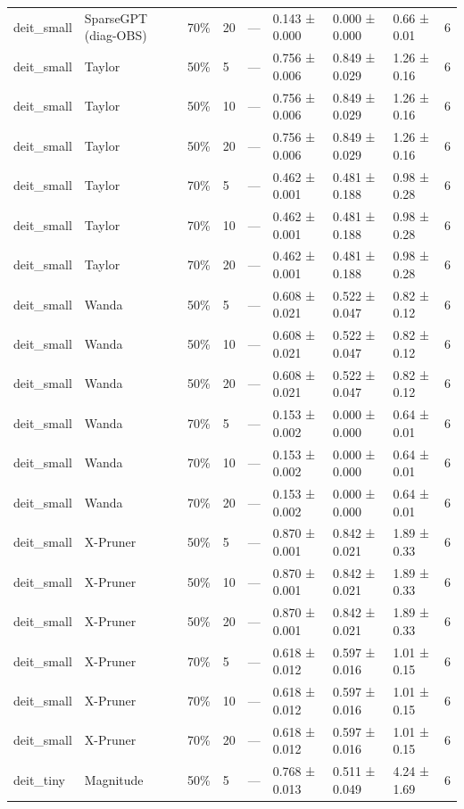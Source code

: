 \begin{table}[t]
\begin{tabular}{lllllllll}
deit\_small & SparseGPT (diag-OBS) & 70\% & 20 & — & 0.143 ± 0.000 & 0.000 ± 0.000 & 0.66 ± 0.01 & 6 \\
deit\_small & Taylor & 50\% & 5 & — & 0.756 ± 0.006 & 0.849 ± 0.029 & 1.26 ± 0.16 & 6 \\
deit\_small & Taylor & 50\% & 10 & — & 0.756 ± 0.006 & 0.849 ± 0.029 & 1.26 ± 0.16 & 6 \\
deit\_small & Taylor & 50\% & 20 & — & 0.756 ± 0.006 & 0.849 ± 0.029 & 1.26 ± 0.16 & 6 \\
deit\_small & Taylor & 70\% & 5 & — & 0.462 ± 0.001 & 0.481 ± 0.188 & 0.98 ± 0.28 & 6 \\
deit\_small & Taylor & 70\% & 10 & — & 0.462 ± 0.001 & 0.481 ± 0.188 & 0.98 ± 0.28 & 6 \\
deit\_small & Taylor & 70\% & 20 & — & 0.462 ± 0.001 & 0.481 ± 0.188 & 0.98 ± 0.28 & 6 \\
deit\_small & Wanda & 50\% & 5 & — & 0.608 ± 0.021 & 0.522 ± 0.047 & 0.82 ± 0.12 & 6 \\
deit\_small & Wanda & 50\% & 10 & — & 0.608 ± 0.021 & 0.522 ± 0.047 & 0.82 ± 0.12 & 6 \\
deit\_small & Wanda & 50\% & 20 & — & 0.608 ± 0.021 & 0.522 ± 0.047 & 0.82 ± 0.12 & 6 \\
deit\_small & Wanda & 70\% & 5 & — & 0.153 ± 0.002 & 0.000 ± 0.000 & 0.64 ± 0.01 & 6 \\
deit\_small & Wanda & 70\% & 10 & — & 0.153 ± 0.002 & 0.000 ± 0.000 & 0.64 ± 0.01 & 6 \\
deit\_small & Wanda & 70\% & 20 & — & 0.153 ± 0.002 & 0.000 ± 0.000 & 0.64 ± 0.01 & 6 \\
deit\_small & X-Pruner & 50\% & 5 & — & 0.870 ± 0.001 & 0.842 ± 0.021 & 1.89 ± 0.33 & 6 \\
deit\_small & X-Pruner & 50\% & 10 & — & 0.870 ± 0.001 & 0.842 ± 0.021 & 1.89 ± 0.33 & 6 \\
deit\_small & X-Pruner & 50\% & 20 & — & 0.870 ± 0.001 & 0.842 ± 0.021 & 1.89 ± 0.33 & 6 \\
deit\_small & X-Pruner & 70\% & 5 & — & 0.618 ± 0.012 & 0.597 ± 0.016 & 1.01 ± 0.15 & 6 \\
deit\_small & X-Pruner & 70\% & 10 & — & 0.618 ± 0.012 & 0.597 ± 0.016 & 1.01 ± 0.15 & 6 \\
deit\_small & X-Pruner & 70\% & 20 & — & 0.618 ± 0.012 & 0.597 ± 0.016 & 1.01 ± 0.15 & 6 \\
deit\_tiny & Magnitude & 50\% & 5 & — & 0.768 ± 0.013 & 0.511 ± 0.049 & 4.24 ± 1.69 & 6 \\

\end{tabular}
\end{table}
